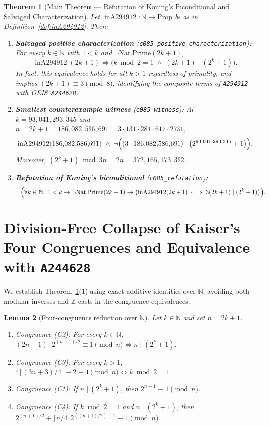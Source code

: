 \documentclass[11pt]{article}
\newtheorem{theorem}{Theorem}[section]
\newtheorem{lemma}[theorem]{Lemma}
\theoremstyle{definition}
\newcommand{\N}{\mathbb{N}}
\newcommand{\Z}{\mathbb{Z}}
\newcommand{\seq}[1]{\texttt{#1}}
\newcommand{\inA}{\operatorname{inA294912}}
\begin{document}
\begin{theorem}[Main Theorem --- Refutation of Koning's Biconditional and Salvaged Characterization]
\label{thm:main}
Let $\inA : \N \to \mathrm{Prop}$ be as in Definition~\ref{def:inA294912}. Then:
\begin{enumerate}
\item[\textup{(1)}] \textbf{Salvaged positive characterization} (\textup{\texttt{c085\_positive\_characterization}})\textbf{:} For every $k \in \N$ with $1 < k$ and $\neg\mathrm{Nat.Prime}(2k + 1)$,
\[
\inA(2k + 1) \iff \bigl(k \bmod 2 = 1 \;\land\; (2k + 1) \mid (2^k + 1)\bigr).
\]
In fact, this equivalence holds for all $k > 1$ regardless of primality, and implies $(2k + 1) \equiv 3 \pmod 8$, identifying the composite terms of \seq{A294912} with OEIS~\seq{A244628}.
\item[\textup{(2)}] \textbf{Smallest counterexample witness} (\textup{\texttt{c085\_witness}})\textbf{:} At $k = 93{,}041{,}293{,}345$ and $n = 2k + 1 = 186{,}082{,}586{,}691 = 3 \cdot 131 \cdot 281 \cdot 617 \cdot 2731$,
\[
\inA(186{,}082{,}586{,}691) \;\land\; \neg\Bigl((3 \cdot 186{,}082{,}586{,}691) \mid \bigl(2^{93{,}041{,}293{,}345} + 1\bigr)\Bigr).
\]
Moreover, $(2^k + 1) \bmod 3n = 2n = 372{,}165{,}173{,}382$.
\item[\textup{(3)}] \textbf{Refutation of Koning's biconditional} (\textup{\texttt{c085\_refutation}})\textbf{:}
\[
\neg\Bigl(\forall k \in \N,\; 1 < k \to \neg\mathrm{Nat.Prime}(2k + 1) \to \bigl(\inA(2k + 1) \iff 3(2k + 1) \mid (2^k + 1)\bigr)\Bigr).
\]
\end{enumerate}
\end{theorem}

\section{Division-Free Collapse of Kaiser's Four Congruences and Equivalence with \texorpdfstring{\seq{A244628}}{A244628}}
\label{sec:reduction}

We establish Theorem~\ref{thm:main}(1) using exact additive identities over $\N$, avoiding both modular inverses and $\Z$-casts in the congruence equivalences.

\begin{lemma}[Four-congruence reduction over $\N$]
\label{lem:four-congruences}
Let $k \in \N$ and set $n = 2k + 1$.
\begin{enumerate}
\item[\textup{(a)}] \emph{Congruence (C2):} For every $k \in \N$, $(2n - 1) \cdot 2^{(n-1)/2} \equiv 1 \pmod n \iff n \mid (2^k + 1)$.
\item[\textup{(b)}] \emph{Congruence (C3):} For every $k > 1$, $4 \lfloor (3n + 3)/4 \rfloor - 2 \equiv 1 \pmod n \iff k \bmod 2 = 1$.
\item[\textup{(c)}] \emph{Congruence (C1):} If $n \mid (2^k + 1)$, then $2^{n-1} \equiv 1 \pmod n$.
\item[\textup{(d)}] \emph{Congruence (C4):} If $k \bmod 2 = 1$ and $n \mid (2^k + 1)$, then $2^{(n+1)/2} + \lfloor n/4 \rfloor 2^{((n+1)/2)+1} \equiv 1 \pmod n$.
\end{enumerate}
\end{lemma}
\end{document}
